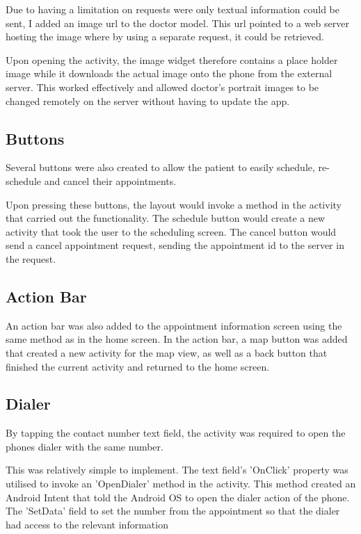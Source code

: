 Due to having a limitation on requests were only textual information could be sent, I added an image url to the doctor model. This url pointed to a web server hosting the image where by using a separate request, it could be retrieved.

Upon opening the activity, the image widget therefore contains a place holder image while it downloads the actual image onto the phone from the external server. This worked effectively and allowed doctor's portrait images to be changed remotely on the server without having to update the app.

\subsection{Buttons}

Several buttons were also created to allow the patient to easily schedule, re-schedule and cancel their appointments.

Upon pressing these buttons, the layout would invoke a method in the activity that carried out the functionality. The schedule button would create a new activity that took the user to the scheduling screen. The cancel button would send a cancel appointment request, sending the appointment id to the server in the request.

\subsection{Action Bar}

An action bar was also added to the appointment information screen using the same method as in the home screen. In the action bar, a map button was added that created a new activity for the map view, as well as a back button that finished the current activity and returned to the home screen.

\subsection{Dialer}

By tapping the contact number text field, the activity was required to open the phones dialer with the same number.

This was relatively simple to implement. The text field's 'OnClick' property was utilised to invoke an 'OpenDialer' method in the activity. This method created an Android Intent that told the Android OS to open the dialer action of the phone. The 'SetData' field to set the number from the appointment so that the dialer had access to the relevant information

